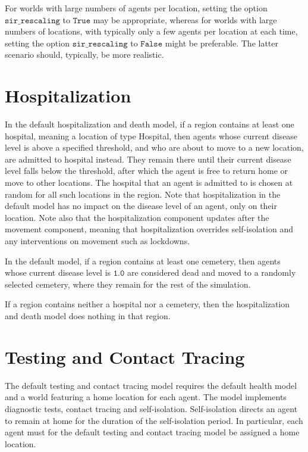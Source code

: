 \documentclass[10pt,letterpaper]{article}
\begin{document}
For worlds with large numbers of agents per location, setting the option $\texttt{sir{\_}rescaling}$ to $\texttt{True}$ may be appropriate, whereas for worlds with large numbers of locations, with typically only a few agents per location at each time, setting the option $\texttt{sir{\_}rescaling}$ to $\texttt{False}$ might be preferable. The latter scenario should, typically, be more realistic.

\section{Hospitalization}

In the default hospitalization and death model, if a region contains at least one hospital, meaning a location of type Hospital, then agents whose current disease level is above a specified threshold, and who are about to move to a new location, are admitted to hospital instead. They remain there until their current disease level falls below the threshold, after which the agent is free to return home or move to other locations. The hospital that an agent is admitted to is chosen at random for all such locations in the region. Note that hospitalization in the default model has no impact on the disease level of an agent, only on their location. Note also that the hospitalization component updates after the movement component, meaning that hospitalization overrides self-isolation and any interventions on movement such as lockdowns.

In the default model, if a region contains at least one cemetery, then agents whose current disease level is $\texttt{1.0}$ are considered dead and moved to a randomly selected cemetery, where they remain for the rest of the simulation.

If a region contains neither a hospital nor a cemetery, then the hospitalization and death model does nothing in that region.

\section{Testing and Contact Tracing}

The default testing and contact tracing model requires the default health model and a world featuring a home location for each agent. The model implements diagnostic tests, contact tracing and self-isolation. Self-isolation directs an agent to remain at home for the duration of the self-isolation period. In particular, each agent must for the default testing and contact tracing model be assigned a home location.
\end{document}

